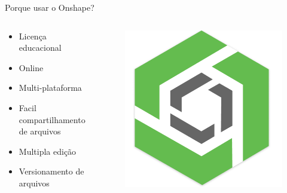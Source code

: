 \documentclass{cubeamer}
\begin{document}
\begin{frame}{Porque usar o Onshape?}
    \begin{columns}

        \begin{column}{0.5\textwidth}
            \begin{itemize}
                \item Licença educacional
                \item Online
                \item Multi-plataforma
                \item Facil compartilhamento de arquivos
                \item Multipla edição
                \item Versionamento de arquivos
            \end{itemize}
        \end{column}

        \begin{column}{0.5\textwidth}
            \begin{figure}
                \centering
                \includegraphics[height = 0.6\textheight]{img/onshape.png}
                \caption{\cite{Onshape:online}}
            \end{figure}
        \end{column}

    \end{columns}
\end{frame}
\end{document}
